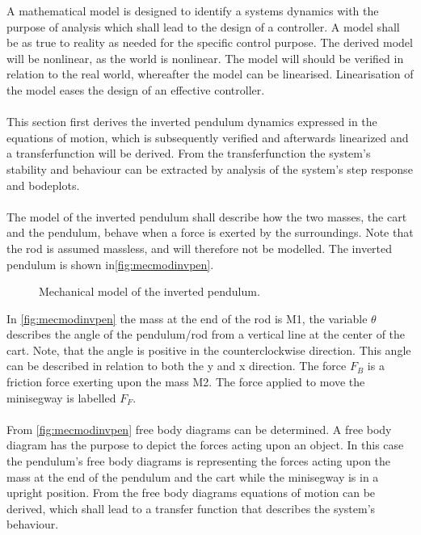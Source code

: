 A mathematical model is designed to identify a systems dynamics with the purpose of analysis which shall lead to the design of a controller. A model  shall be as true to reality as needed for the specific control purpose.
The derived model will be nonlinear, as the world is nonlinear. The model will should be verified in relation to the real world, whereafter the model can be linearised. Linearisation of the model eases the design of an effective controller.\\\\%
This section first derives the inverted pendulum dynamics expressed in the equations of motion, which is subsequently verified and afterwards linearized and a transferfunction will be derived. From the transferfunction the system's stability and behaviour can be extracted by analysis of the system's step response and bodeplots. 
\\\\
The model of the inverted pendulum shall describe how the two masses, the cart and the pendulum, behave when a force is exerted by the surroundings. Note that the rod is assumed massless, and will therefore not be modelled. The inverted pendulum is shown in\autoref{fig:mecmodinvpen}.
\begin{figure}[H]
\centering
\scalebox{3}{}
\caption{Mechanical model of the inverted pendulum.}
\label{fig:mecmodinvpen}
\end{figure}
In \autoref{fig:mecmodinvpen} the mass at the end of the rod is M1, the variable $\theta$ describes the angle of the pendulum/rod from a vertical line at the center of the cart. Note, that the angle is positive in the counterclockwise direction. This angle can be described in relation to both the y and x direction. The force $F_B$ is a friction force exerting upon the mass M2. The force applied to move the minisegway is labelled $F_F$. \\\\
From \autoref{fig:mecmodinvpen} free body diagrams can be determined. A free body diagram has the purpose to depict the forces acting upon an object. In this case the pendulum's free body diagrams is representing the forces acting upon the mass at the end of the pendulum and the cart while the minisegway is in a upright position. From the free body diagrams equations of motion can be derived, which shall lead to a transfer function that describes the system's behaviour.\\
